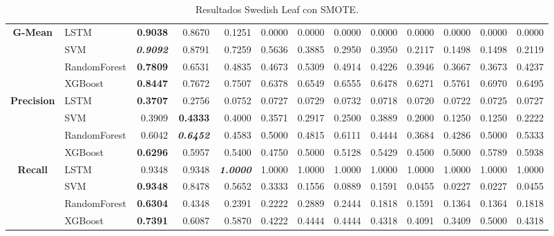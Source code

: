 \begin{table}[H]
\begin{adjustbox}{max width=12cm}
\begin{tabular}{|c|l|r|r|r|r|r|r|r|r|r|r|r|}
		\hline
		\textbf{G-Mean} &  LSTM & \textbf{  0.9038 } &  0.8670 &  0.1251 &  0.0000 &  0.0000 &  0.0000 &  0.0000 &  0.0000 &  0.0000 &  0.0000 &  0.0000 \\
		&  SVM & \textit{ \textbf{  0.9092 } } &  0.8791 &  0.7259 &  0.5636 &  0.3885 &  0.2950 &  0.3950 &  0.2117 &  0.1498 &  0.1498 &  0.2119 \\
		&  RandomForest & \textbf{  0.7809 } &  0.6531 &  0.4835 &  0.4673 &  0.5309 &  0.4914 &  0.4226 &  0.3946 &  0.3667 &  0.3673 &  0.4237 \\
		&  XGBoost & \textbf{  0.8447 } &  0.7672 &  0.7507 &  0.6378 &  0.6549 &  0.6555 &  0.6478 &  0.6271 &  0.5761 &  0.6970 &  0.6495 \\
		\hline
		\textbf{Precision} &  LSTM & \textbf{  0.3707 } &  0.2756 &  0.0752 &  0.0727 &  0.0729 &  0.0732 &  0.0718 &  0.0720 &  0.0722 &  0.0725 &  0.0727 \\
		&  SVM &  0.3909 & \textbf{  0.4333 } &  0.4000 &  0.3571 &  0.2917 &  0.2500 &  0.3889 &  0.2000 &  0.1250 &  0.1250 &  0.2222 \\
		&  RandomForest &  0.6042 & \textit{ \textbf{  0.6452 } } &  0.4583 &  0.5000 &  0.4815 &  0.6111 &  0.4444 &  0.3684 &  0.4286 &  0.5000 &  0.5333 \\
		&  XGBoost & \textbf{  0.6296 } &  0.5957 &  0.5400 &  0.4750 &  0.5000 &  0.5128 &  0.5429 &  0.4500 &  0.5000 &  0.5789 &  0.5938 \\
		\hline
		\textbf{Recall} &  LSTM &  0.9348 &  0.9348 & \textit{ \textbf{  1.0000 } } &  1.0000 &  1.0000 &  1.0000 &  1.0000 &  1.0000 &  1.0000 &  1.0000 &  1.0000 \\
		&  SVM & \textbf{  0.9348 } &  0.8478 &  0.5652 &  0.3333 &  0.1556 &  0.0889 &  0.1591 &  0.0455 &  0.0227 &  0.0227 &  0.0455 \\
		&  RandomForest & \textbf{  0.6304 } &  0.4348 &  0.2391 &  0.2222 &  0.2889 &  0.2444 &  0.1818 &  0.1591 &  0.1364 &  0.1364 &  0.1818 \\
		&  XGBoost & \textbf{  0.7391 } &  0.6087 &  0.5870 &  0.4222 &  0.4444 &  0.4444 &  0.4318 &  0.4091 &  0.3409 &  0.5000 &  0.4318 \\
		\hline
	\end{tabular}
\end{adjustbox}
\caption{Resultados Swedish Leaf con SMOTE.}
\label{tab:SLeaf_SMOTE}
\end{table}

